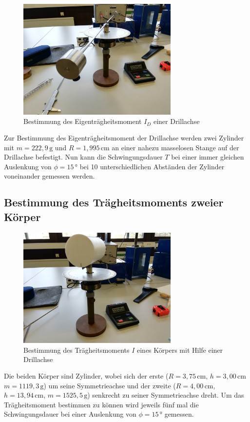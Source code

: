 \begin{figure}[H]
    \centering
    \includegraphics[width=8cm]{content/2.jpg}
    \caption{Bestimmung des Eigenträgheitsmoment $I_D$ einer Drillachse}
    \label{fig:b}
\end{figure}

\noindent Zur Bestimmung des Eigenträgheitsmoment der
Drillachse werden zwei Zylinder mit $m=222,9\,\si{\gram}$ und $R=1,995\,\si{\centi\meter}$ an einer nahezu
masselosen Stange auf der Drillachse befestigt. Nun
kann die Schwingungsdauer $T$ bei einer immer gleichen
Auslenkung von $\phi=15\,\si{\degree}$ bei 10 unterschiedlichen Abständen der
Zylinder voneinander gemessen werden.



\subsection{Bestimmung des Trägheitsmoments zweier Körper}
\begin{figure}[H]
    \centering
    \includegraphics[width=8cm]{content/3.jpg}
    \caption{Bestimmung des Trägheitsmoments $I$ eines Körpers mit Hilfe einer Drillachse}
    \label{fig:b}
\end{figure}
Die beiden Körper sind Zylinder, wobei sich der erste 
($R=3,75\,\si{\centi\meter}$, $h=3,00\,\si{\centi\meter} $ $m=1119,3\,\si{\gram}$)
um seine Symmetrieachse und der zweite 
($R=4,00\,\si{\centi\meter}$, $h=13,94\,\si{\centi\meter}$, $m=1525,5\,\si{\gram}$)
senkrecht zu seiner Symmetrieachse dreht. Um
das Trägheitsmoment bestimmen zu können wird jeweils
fünf mal die Schwingungsdauer bei einer Auslenkung
von $\phi=15\,\si{\degree}$ gemessen.


